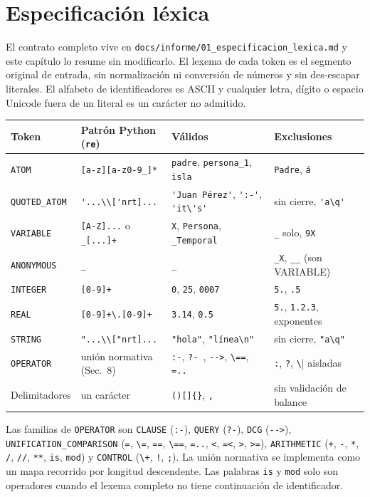 \documentclass[11pt,a4paper]{article}
\begin{document}
\section{Especificación léxica}
El contrato completo vive en
\verb|docs/informe/01_especificacion_lexica.md| y este capítulo lo
resume sin modificarlo. El lexema de cada token es el segmento
original de entrada, sin normalización ni conversión de números y sin
des-escapar literales. El alfabeto de identificadores es ASCII y
cualquier letra, dígito o espacio Unicode fuera de un literal es un
carácter no admitido.

{\small
\begin{longtable}{llll}
  \toprule
  Token & Patrón Python (\verb|re|) & Válidos & Exclusiones \\
  \midrule
  \endhead
  \verb|ATOM| & \verb|[a-z][a-z0-9_]*| & \verb|padre|,
  \verb|persona_1|, \verb|isla| & \verb|Padre|, \verb|á| \\
  \verb|QUOTED_ATOM| & \verb|'...\\['nrt]...| & \verb|'Juan Pérez'|,
  \verb|':-'|, \verb|'it\'s'| & sin cierre, \verb|'a\q'| \\
  \verb|VARIABLE| & \verb|[A-Z]...| o \verb|_[...]+| & \verb|X|,
  \verb|Persona|, \verb|_Temporal| & \verb|_| solo, \verb|9X| \\
  \verb|ANONYMOUS| & \verb|_| & \verb|_| & \verb|_X|, \verb|__| (son
  VARIABLE) \\
  \verb|INTEGER| & \verb|[0-9]+| & \verb|0|, \verb|25|, \verb|0007| &
  \verb|5.|, \verb|.5| \\
  \verb|REAL| & \verb|[0-9]+\.[0-9]+| & \verb|3.14|, \verb|0.5| &
  \verb|5.|, \verb|1.2.3|, exponentes \\
  \verb|STRING| & \verb|"...\\["nrt]...| & \verb|"hola"|,
  \verb|"línea\n"| & sin cierre, \verb|"a\q"| \\
  \verb|OPERATOR| & unión normativa (Sec.\ 8) & \verb|:-|,
  \verb|?- |, \verb|-->|, \verb|\==|, \verb|=..| & \verb|:|, \verb|?|,
  \verb|\| aisladas \\
  Delimitadores & un carácter & \verb|()[]{}|, \verb|,| & sin
  validación de balance \\
  \bottomrule
\end{longtable}
}

Las familias de \verb|OPERATOR| son \verb|CLAUSE| (\verb|:-|),
\verb|QUERY| (\verb|?-|), \verb|DCG| (\verb|-->|),
\verb|UNIFICATION_COMPARISON| (\verb|=|, \verb|\=|, \verb|==|,
\verb|\==|, \verb|=..|, \verb|<|, \verb|=<|, \verb|>|, \verb|>=|),
\verb|ARITHMETIC| (\verb|+|, \verb|-|, \verb|*|, \verb|/|, \verb|//|,
\verb|**|, \verb|is|, \verb|mod|) y \verb|CONTROL| (\verb|\+|,
\verb|!|, \verb|;|). La unión normativa se implementa como un mapa
recorrido por longitud descendente. Las palabras \verb|is| y
\verb|mod| solo son operadores cuando el lexema completo no tiene
continuación de identificador.
\end{document}
